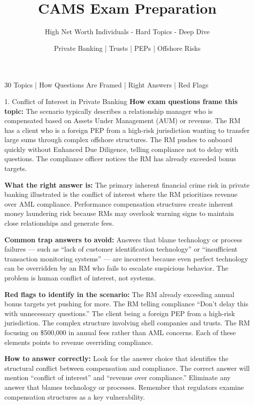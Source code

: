 \documentclass[11pt,a4paper]{beamer}
\title[CAMS Exam Preparation]{CAMS Exam Preparation}
\subtitle{High Net Worth Individuals - Hard Topics - Deep Dive}
\author{Private Banking | Trusts | PEPs | Offshore Risks}
\date{}
\begin{document}
	
	\begin{frame}
		\titlepage
		\centering
		\tiny 30 Topics | How Questions Are Framed | Right Answers | Red Flags
	\end{frame}
	
	\begin{frame}{1. Conflict of Interest in Private Banking}
		\tiny
		\noindent\textbf{How exam questions frame this topic:} The scenario typically describes a relationship manager who is compensated based on Assets Under Management (AUM) or revenue. The RM has a client who is a foreign PEP from a high-risk jurisdiction wanting to transfer large sums through complex offshore structures. The RM pushes to onboard quickly without Enhanced Due Diligence, telling compliance not to delay with questions. The compliance officer notices the RM has already exceeded bonus targets.
		
		\vspace{0.1cm}
		\noindent\textbf{What the right answer is:} The primary inherent financial crime risk in private banking illustrated is the conflict of interest where the RM prioritizes revenue over AML compliance. Performance compensation structures create inherent money laundering risk because RMs may overlook warning signs to maintain close relationships and generate fees.
		
		\vspace{0.1cm}
		\noindent\textbf{Common trap answers to avoid:} Answers that blame technology or process failures — such as “lack of customer identification technology” or “insufficient transaction monitoring systems” — are incorrect because even perfect technology can be overridden by an RM who fails to escalate suspicious behavior. The problem is human conflict of interest, not systems.
		
		\vspace{0.1cm}
		\noindent\textbf{Red flags to identify in the scenario:} The RM already exceeding annual bonus targets yet pushing for more. The RM telling compliance “Don't delay this with unnecessary questions.” The client being a foreign PEP from a high-risk jurisdiction. The complex structure involving shell companies and trusts. The RM focusing on \$500,000 in annual fees rather than AML concerns. Each of these elements points to revenue overriding compliance.
		
		\vspace{0.1cm}
		\noindent\textbf{How to answer correctly:} Look for the answer choice that identifies the structural conflict between compensation and compliance. The correct answer will mention “conflict of interest” and “revenue over compliance.” Eliminate any answer that blames technology or processes. Remember that regulators examine compensation structures as a key vulnerability.
	\end{frame}
	
\end{document}
